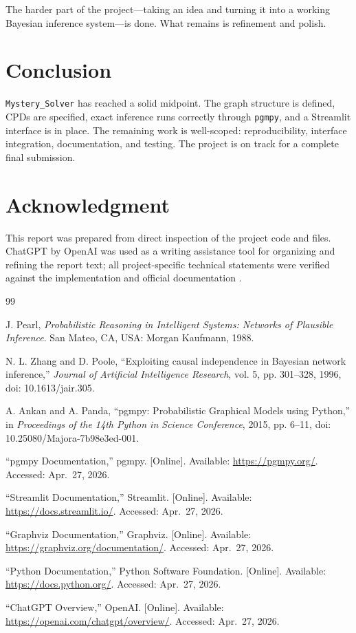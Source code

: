 \documentclass[conference]{IEEEtran}
\begin{document}
The harder part of the project---taking an idea and turning it into a working Bayesian inference system---is done. What remains is refinement and polish.

\section{Conclusion}
\texttt{Mystery\_Solver} has reached a solid midpoint. The graph structure is defined, CPDs are specified, exact inference runs correctly through \texttt{pgmpy}, and a Streamlit interface is in place. The remaining work is well-scoped: reproducibility, interface integration, documentation, and testing. The project is on track for a complete final submission.

\section*{Acknowledgment}
This report was prepared from direct inspection of the project code and files. ChatGPT by OpenAI was used as a writing assistance tool for organizing and refining the report text; all project-specific technical statements were verified against the implementation and official documentation \cite{chatgpt}.

\begin{thebibliography}{99}

J. Pearl, \textit{Probabilistic Reasoning in Intelligent Systems: Networks of Plausible Inference}. San Mateo, CA, USA: Morgan Kaufmann, 1988.

N. L. Zhang and D. Poole, ``Exploiting causal independence in Bayesian network inference,'' \textit{Journal of Artificial Intelligence Research}, vol. 5, pp. 301--328, 1996, doi: 10.1613/jair.305.

A. Ankan and A. Panda, ``pgmpy: Probabilistic Graphical Models using Python,'' in \textit{Proceedings of the 14th Python in Science Conference}, 2015, pp. 6--11, doi: 10.25080/Majora-7b98e3ed-001.

``pgmpy Documentation,'' pgmpy. [Online]. Available: \url{https://pgmpy.org/}. Accessed: Apr.~27, 2026.

``Streamlit Documentation,'' Streamlit. [Online]. Available: \url{https://docs.streamlit.io/}. Accessed: Apr.~27, 2026.

``Graphviz Documentation,'' Graphviz. [Online]. Available: \url{https://graphviz.org/documentation/}. Accessed: Apr.~27, 2026.

``Python Documentation,'' Python Software Foundation. [Online]. Available: \url{https://docs.python.org/}. Accessed: Apr.~27, 2026.

``ChatGPT Overview,'' OpenAI. [Online]. Available: \url{https://openai.com/chatgpt/overview/}. Accessed: Apr.~27, 2026.

\end{thebibliography}
\end{document}
